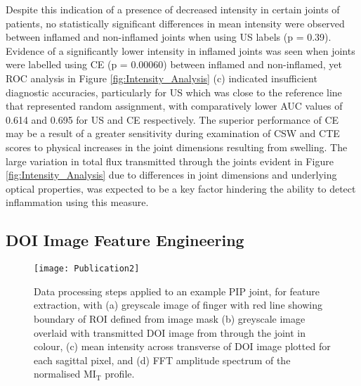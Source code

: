 \documentclass[twoside]{bhamthesis}
\theoremstyle{definition}
\begin{document}
Despite this indication of a presence of decreased intensity in certain joints of patients, no statistically significant differences in mean intensity were observed between inflamed and non-inflamed joints when using US labels (p = 0.39). Evidence of a significantly lower intensity in inflamed joints was seen when joints were labelled using CE (p = 0.00060) between inflamed and non-inflamed, yet ROC analysis in Figure \ref{fig:Intensity_Analysis} (c) indicated insufficient diagnostic accuracies, particularly for US which was close to the reference line that represented random assignment, with comparatively lower AUC values of 0.614 and 0.695 for US and CE respectively. The superior performance of CE may be a result of a greater sensitivity during examination of CSW and CTE scores to physical increases in the joint dimensions resulting from swelling. The large variation in total flux transmitted through the joints evident in Figure \ref{fig:Intensity_Analysis} due to differences in joint dimensions and underlying optical properties, was expected to be a key factor hindering the ability to detect inflammation using this measure.


\subsection{DOI Image Feature Engineering}
\label{DOI Image Feature Engineering}

\begin{figure}[!ht]
\centering
  \texttt{[image: Publication2]}
\caption{Data processing steps applied to an example PIP joint, for feature extraction, with (a) greyscale image of finger with red line showing boundary of ROI defined from image mask (b) greyscale image overlaid with transmitted DOI image from through the joint in colour, (c) mean intensity across transverse of DOI image plotted for each sagittal pixel, and (d) FFT amplitude spectrum of the normalised $\mathrm{MI_T}$ profile.}
\label{fig:Feature_extraction}
\end{figure}
\end{document}
